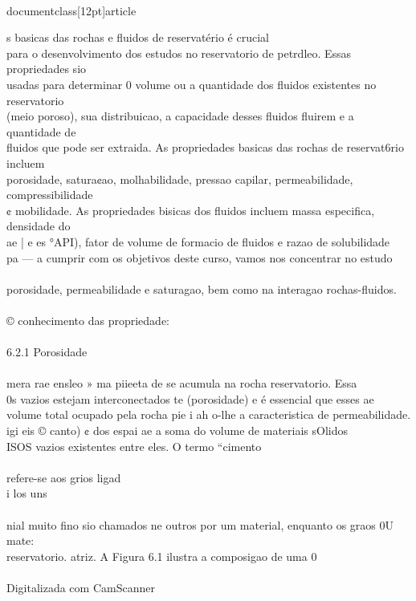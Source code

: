 \\documentclass[12pt]{article}
\begin{document}
s basicas das rochas e fluidos de reservatério é crucial\\
para o desenvolvimento dos estudos no reservatorio de petrdleo. Essas propriedades sio\\
usadas para determinar 0 volume ou a quantidade dos fluidos existentes no reservatorio\\
(meio poroso), sua distribuicao, a capacidade desses fluidos fluirem e a quantidade de\\
fluidos que pode ser extraida. As propriedades basicas das rochas de reservat6rio incluem\\
porosidade, satura¢ao, molhabilidade, pressao capilar, permeabilidade, compressibilidade\\
¢ mobilidade. As propriedades bisicas dos fluidos incluem massa especifica, densidade do\\
ae | e es °API), fator de volume de formacio de fluidos e razao de solubilidade\\
pa — a cumprir com os objetivos deste curso, vamos nos concentrar no estudo\\
\\
porosidade, permeabilidade e saturagao, bem como na interagao rochas-fluidos.\\
\\
© conhecimento das propriedade:\\
\\
6.2.1 Porosidade\\
\\
mera rae ensleo » ma piieeta de se acumula na rocha reservatorio. Essa\\
0s vazios estejam interconectados te (porosidade) e é essencial que esses ae\\
volume total ocupado pela rocha pie i ah o-lhe a caracteristica de permeabilidade.\\
igi eis © canto) ¢ dos espai ae a soma do volume de materiais sOlidos\\
ISOS vazios existentes entre eles. O termo “cimento\\
\\
refere-se aos grios ligad\\
i los uns\\
\\
nial muito fino sio chamados ne outros por um material, enquanto os graos 0U mate:\\
reservatorio. atriz. A Figura 6.1 ilustra a composigao de uma 0\\
\\
Digitalizada com CamScanner\\
\end{document}
